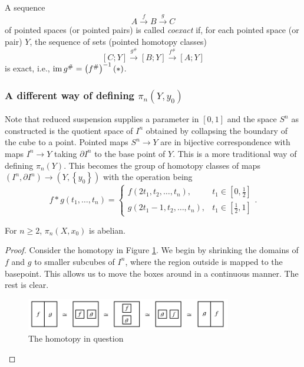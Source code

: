   \begin{definition}[Coexact]
      A sequence 
      \[
      A \stackrel{f}{\to} B \stackrel{g}{\to} C
      \] 
      of pointed spaces (or pointed pairs) is
      called \textit{coexact} if, for each pointed space
      (or pair) $Y$, the sequence of sets
      (pointed homotopy classes)
      \[
      \left[ C;Y \right] \stackrel{g^{\#}}{\to} 
      \left[ B;Y \right] \stackrel{f^{\#}}{\to} 
      \left[ A;Y \right] 
      \] 
      is exact, i.e., 
      $\operatorname{im} g^{\#} = \left( f^{\#} \right)^{-1} (*)$.
  \end{definition}


  \newpage




  \subsubsection{A different way of defining
  $\pi_n \left( Y, y_0 \right) $}
  Note that reduced suspension supplies a parameter in
  $\left[ 0,1 \right] $ and the space
  $S^{n}$ as constructed is the quotient space of
  $I^{n}$ obtained by collapsing the boundary of the cube to a
  point.
  Pointed maps $S^{n}\to Y$ are in bijective correspondence
  with maps $I^{n}\to Y$ taking $\partial I^{n}$ to
  the base point of $Y$. This is a more traditional way
  of defining $\pi_n(Y)$. This becomes the group
  of homotopy classes of maps
  $\left( I^{n},\partial I^{n} \right) \to 
  \left( Y, \left\{ y_0 \right\}  \right) $ with the
  operation being
  \[
  f*g \left( t_1, \ldots, t_n \right) =
  \begin{cases}
      f\left( 2t_1, t_2, \ldots, t_n \right) ,& t_1 \in 
      \left[ 0,\frac{1}{2} \right] \\
      g\left( 2t_1-1, t_2, \ldots, t_n \right) ,& t_1 \in 
      \left[ \frac{1}{2},1 \right] 
  \end{cases}.
  \] 

  \begin{proposition}[]
      For $n\ge 2$, $\pi_n\left( X, x_0 \right)$ is abelian.
  \end{proposition}

  \begin{proof}
      Consider the homotopy in Figure \ref{fig:JIDWOOL0290L-png}.
      We begin by shrinking the domains of $f$ and $g$ to smaller
      subcubes of $I^{n}$, where the region outside is
      mapped to the basepoint. This allows us to move the boxes
      around in a continuous manner. The rest is clear.
      \begin{figure}[htpb]
          \centering
          \includegraphics[width=0.8\textwidth]{Figures/JIDWOOL0290L.png}
          \caption{The homotopy in question}
          \label{fig:JIDWOOL0290L-png}
      \end{figure}
  \end{proof}

